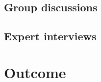 

\subsection{Group discussions}
\label{chapter3-group-discussions}

\subsection{Expert interviews}
\label{chapter3-expert-interviews}

\section{Outcome}
\label{chapter3-outcome}


